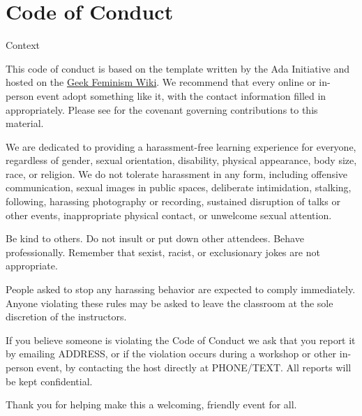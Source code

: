\chapter{Code of Conduct}\label{s:conduct}

\begin{callout}{Context}

  This code of conduct is based on the template written by the Ada
  Initiative and hosted on the
  \href{http://geekfeminism.wikia.com/wiki/Conference\_anti-harassment/Policy}{Geek
    Feminism Wiki}.  We recommend that every online or in-person event
  adopt something like it, with the contact information filled in
  appropriately.  Please see  for the
  covenant governing contributions to this material.

\end{callout}

We are dedicated to providing a harassment-free learning experience
for everyone, regardless of gender, sexual orientation, disability,
physical appearance, body size, race, or religion.  We do not tolerate
harassment in any form, including offensive communication, sexual
images in public spaces, deliberate intimidation, stalking, following,
harassing photography or recording, sustained disruption of talks or
other events, inappropriate physical contact, or unwelcome sexual
attention.

Be kind to others. Do not insult or put down other attendees. Behave
professionally. Remember that sexist, racist, or exclusionary jokes
are not appropriate.

People asked to stop any harassing behavior are expected to comply
immediately.  Anyone violating these rules may be asked to leave the
classroom at the sole discretion of the instructors.

If you believe someone is violating the Code of Conduct we ask that
you report it by emailing ADDRESS, or if the violation occurs during a
workshop or other in-person event, by contacting the host
directly at PHONE/TEXT. All reports will be kept confidential.

Thank you for helping make this a welcoming, friendly event for all.
